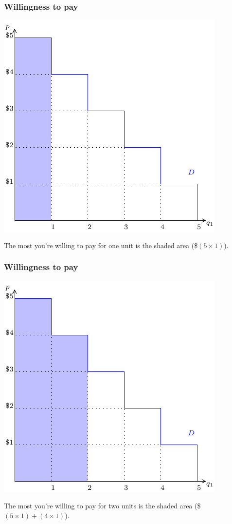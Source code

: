 \documentclass[xcolor=pdftex,dvipsnames]{beamer}
\begin{document}
\begin{frame}
\frametitle{Willingness to pay}
\begin{center}
\includegraphics[scale=0.9]{pics/ConsumerWelfare2}
\end{center}
The most you're willing to pay for one unit is the shaded area
(\$$(5\times 1)$).
\end{frame}

\begin{frame}
\frametitle{Willingness to pay}
\begin{center}
\includegraphics[scale=0.9]{pics/ConsumerWelfare3}
\end{center}
The most you're willing to pay for two units is the shaded area
(\$$(5\times 1) + (4\times 1)$).
\end{frame}
\end{document}
